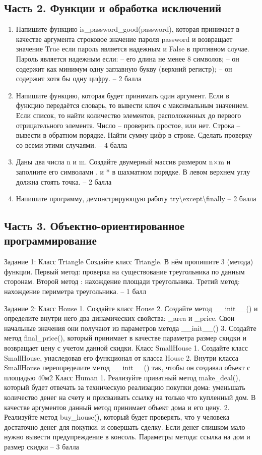 \documentclass[14pt,a4paper]{extarticle}
\newcommand{\straightquote}{\symbol{34}}
\newcommand{\straightquote}{{\fontencoding{T1}\selectfont\symbol{34}}}
\begin{document}
\subsection{Часть 2. Функции и обработка исключений}
\begin{enumerate}[label=\arabic*.]
  \item Напишите функцию is\_password\_good(password), которая принимает в качестве аргумента строковое значение пароля password и возвращает значение True если пароль является надежным и False в противном случае. Пароль является надежным если: – его длина не менее 8 символов; – он содержит как минимум одну заглавную букву (верхний регистр); – он содержит хотя бы одну цифру. – 2 балла
  \item Напишите функцию, которая будет принимать один аргумент. Если в функцию передаётся словарь, то вывести ключ с максимальным значением. Если список, то найти количество элементов, расположенных до первого отрицательного элемента. Число – проверить простое, или нет. Строка – вывести в обратном порядке. Найти сумму цифр в строке. Сделать проверку со всеми этими случаями. – 4 балла
  \item Даны два числа n и m. Создайте двумерный массив размером n$\times$m и заполните его символами \straightquote.\straightquote{} и \straightquote*\straightquote{} в шахматном порядке. В левом верхнем углу должна стоять точка. – 2 балла
  \item Напишите программу, демонстрирующую работу try\textbackslash{}except\textbackslash{}finally – 2 балла
\end{enumerate}

\subsection{Часть 3. Объектно-ориентированное программирование}
Задание 1: Класс Triangle Создайте класс Triangle. В нём пропишите 3 (метода) функции. Первый метод: проверка на существование треугольника по данным сторонам. Второй метод : нахождение площади треугольника. Третий метод: нахождение периметра треугольника. – 1 балл

Задание 2: Класс House 1. Создайте класс House 2. Создайте метод \_\_init\_\_() и определите внутри него два динамических свойства: \_area и \_price. Свои начальные значения они получают из параметров метода \_\_init\_\_() 3. Создайте метод final\_price(), который принимает в качестве параметра размер скидки и возвращает цену с учетом данной скидки. Класс SmallHouse 1. Создайте класс SmallHouse, унаследовав его функционал от класса House 2. Внутри класса SmallHouse переопределите метод \_\_init\_\_() так, чтобы он создавал объект с площадью 40м2 Класс Human 1. Реализуйте приватный метод make\_deal(), который будет отвечать за техническую реализацию покупки дома: уменьшать количество денег на счету и присваивать ссылку на только что купленный дом. В качестве аргументов данный метод принимает объект дома и его цену. 2. Реализуйте метод buy\_house(), который будет проверять, что у человека достаточно денег для покупки, и совершать сделку. Если денег слишком мало - нужно вывести предупреждение в консоль. Параметры метода: ссылка на дом и размер скидки – 3 балла
\end{document}
